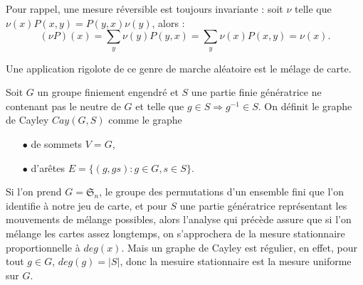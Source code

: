 Pour rappel, une mesure réversible est toujours invariante : soit $\nu$ telle que $\nu(x) P(x,y) = P(y,x)\nu(y)$, alors :
\[(\nu P )(x) = \sum_{y} \nu(y)P(y,x) = \sum_y \nu(x)P(x,y) = \nu(x).\]

Une application rigolote de ce genre de marche aléatoire est le mélage de carte. \\
\begin{definition}
Soit $G$ un groupe finiement engendré et $S$ une partie finie génératrice ne contenant pas le neutre de $G$ et telle que $g\in S \Rightarrow g^{-1}\in S$. On définit le graphe de Cayley $Cay(G,S)$ comme le graphe 
\begin{itemize}
\item[$\bullet$] de sommets $V= G$,
\item[$\bullet$] d'arêtes $E = \{(g,gs) : g\in G, s\in S\}$. \\
\end{itemize} 

Si l'on prend $G = \mathfrak S_n$, le groupe des permutations d'un ensemble fini que l'on identifie à notre jeu de carte, et pour $S$ une partie génératrice représentant les mouvements de mélange possibles, alors l'analyse qui précède assure que si l'on mélange les cartes assez longtemps, on s'approchera de la mesure stationnaire proportionnelle à $deg(x)$. Mais un graphe de Cayley est régulier, en effet, pour tout $g\in G$, $deg(g)= |S|$, donc la mesuire stationnaire est la mesure uniforme sur $G$. 
\end{definition}



